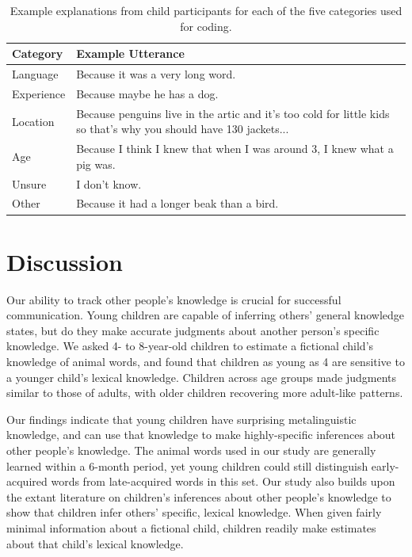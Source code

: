 \documentclass[10pt, letterpaper]{article}
\begin{document}
\begin{table}[tb]
\centering
\begin{tabular}{ll}
  \hline
Category & Example Utterance \\ 
  \hline
Language & Because it was a very long word. \\ 
  Experience & Because maybe he has a dog. \\ 
  Location & Because penguins live in the artic and it's too cold for little kids so that's why you should have 130 jackets... \\ 
  Age & Because I think I knew that when I was around 3, I knew what a pig was. \\ 
  Unsure & I don't know. \\ 
  Other & Because it had a longer beak than a bird. \\ 
   \hline
\end{tabular}
\caption{Example explanations from child participants for each of the five categories used for coding.} 
\label{tab:explanations_table}
\end{table}

\hypertarget{discussion}{%
\section{Discussion}\label{discussion}}

Our ability to track other people's knowledge is crucial for successful
communication. Young children are capable of inferring others' general
knowledge states, but do they make accurate judgments about another
person's specific knowledge. We asked 4- to 8-year-old children to
estimate a fictional child's knowledge of animal words, and found that
children as young as 4 are sensitive to a younger child's lexical
knowledge. Children across age groups made judgments similar to those of
adults, with older children recovering more adult-like patterns.

Our findings indicate that young children have surprising metalinguistic
knowledge, and can use that knowledge to make highly-specific inferences
about other people's knowledge. The animal words used in our study are
generally learned within a 6-month period, yet young children could
still distinguish early-acquired words from late-acquired words in this
set. Our study also builds upon the extant literature on children's
inferences about other people's knowledge to show that children infer
others' specific, lexical knowledge. When given fairly minimal
information about a fictional child, children readily make estimates
about that child's lexical knowledge.
\end{document}
